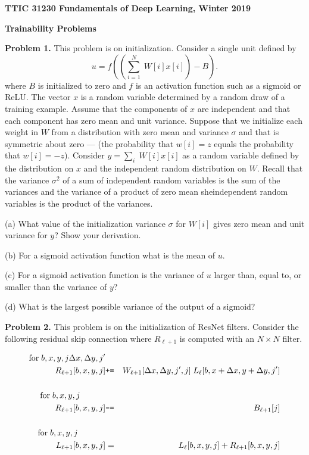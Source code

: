 \documentclass{article}
\begin{document}
\centerline{\bf TTIC 31230 Fundamentals of Deep Learning, Winter 2019}

\bigskip
\centerline{\bf Trainability Problems}

\bigskip
{\bf Problem 1.}  This problem is on initialization.  Consider a single unit defined by
$$u = f\left(\left(\sum_{i=1}^N\;W[i]x[i]\right) - B\right).$$
where $B$ is initialized to zero and $f$ is an activation function such as a sigmoid or ReLU.
The vector $x$ is a random variable determined by a random draw of a training example.
Assume that the components of $x$ are independent and that each component has zero mean and unit variance.
Suppose that we initialize each weight in $W$ from a distribution with
zero mean and variance $\sigma$ and that is symmetric about zero --- (the probability that $w[i] = z$ equals the probability that $w[i] = -z$).
Consider $y = \sum_i\;W[i]x[i]$ as a random variable defined by the distribution on $x$ and the independent random distribution on $W$.
Recall that the variance $\sigma^2$ of
a sum of independent random variables is the sum of the variances and the variance of a product of zero mean sheindependent
random variables is the product of the variances.

\medskip
(a) What value of the initialization variance
$\sigma$ for $W[i]$ gives zero mean and unit variance for $y$?  Show your derivation.

\medskip
(b) For a sigmoid activation function what is the mean of $u$.

\medskip
(c) For a sigmoid activation function
is the variance of $u$ larger than, equal to, or smaller than the variance of $y$?

\medskip
(d) What is the largest possible variance of the output of a sigmoid?

\bigskip
{\bf Problem 2.} This problem is on the initialization of ResNet filters.
Consider the following residual skip connection where $R_{\ell+1}$ is computed with an $N \times N$ filter.

\begin{eqnarray*}
  \mathrm{for}\;b,x,y,j\Delta x,\Delta y,j' \\
  \;\;\;  R_{\ell+1}[b,x,y,j] & \mbox{\tt +=} & W_{\ell+1}[\Delta x, \Delta y, j',j]\; L_{\ell}[b,x + \Delta x, y + \Delta y, j'] \\
  \\
  \mathrm{for}\;b,x,y,j \;\;\;\;\;\;\;\;\;\;\;\\
    \;\;\;  R_{\ell+1}[b,x,y,j] & \mbox{\tt -=} & B_{\ell+1}[j] \\
\\
\mathrm{for}\;b,x,y,j\;\;\;\;\;\;\;\;\;\;\;\;\\
L_{\ell+1}[b,x,y,j] & = & L_{\ell}[b,x,y,j] + R_{\ell+1}[b,x,y,j]
\end{eqnarray*}
\end{document}
